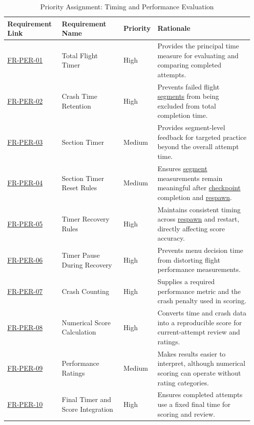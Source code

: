 \documentclass[12pt]{article}
\begin{document}
\begin{table}[htbp]
\centering
\small
\caption{Priority Assignment: Timing and Performance Evaluation}
\label{tab:priority-performance}
\begin{tabular}{p{2.1cm} p{2.7cm} p{1.3cm} p{7.0cm}}
\hline
\textbf{Requirement Link} & \textbf{Requirement Name} & \textbf{Priority} & \textbf{Rationale} \\
\hline
\hyperref[sec:s2-performance]{FR-PER-01} & Total Flight Timer & High & Provides the principal time measure for evaluating and comparing completed attempts. \\
\hyperref[sec:s2-performance]{FR-PER-02} & Crash Time Retention & High & Prevents failed flight \hyperlink{glos:Checkpoint}{segments} from being excluded from total completion time. \\
\hyperref[sec:s2-performance]{FR-PER-03} & Section Timer & Medium & Provides segment-level feedback for targeted practice beyond the overall attempt time. \\
\hyperref[sec:s2-performance]{FR-PER-04} & Section Timer Reset Rules & Medium & Ensures \hyperlink{glos:Checkpoint}{segment} measurements remain meaningful after \hyperlink{glos:Checkpoint}{checkpoint} completion and \hyperlink{glos:Respawn}{respawn}. \\
\hyperref[sec:s2-performance]{FR-PER-05} & Timer Recovery Rules & High & Maintains consistent timing across \hyperlink{glos:Respawn}{respawn} and restart, directly affecting score accuracy. \\
\hyperref[sec:s2-performance]{FR-PER-06} & Timer Pause During Recovery & High & Prevents menu decision time from distorting flight performance measurements. \\
\hyperref[sec:s2-performance]{FR-PER-07} & Crash Counting & High & Supplies a required performance metric and the crash penalty used in scoring. \\
\hyperref[sec:s2-performance]{FR-PER-08} & Numerical Score Calculation & High & Converts time and crash data into a reproducible score for current-attempt review and ratings. \\
\hyperref[sec:s2-performance]{FR-PER-09} & Performance Ratings & Medium & Makes results easier to interpret, although numerical scoring can operate without rating categories. \\
\hyperref[sec:s2-performance]{FR-PER-10} & Final Timer and Score Integration & High & Ensures completed attempts use a fixed final time for scoring and review. \\
\hline
\end{tabular}
\end{table}
\end{document}
